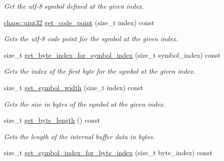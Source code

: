 \begin{DoxyCompactItemize}
\begin{DoxyCompactList}\small\item\em Get the utf-\/8 symbol defined at the given index. \end{DoxyCompactList}\item 
\hyperlink{namespacechaos_a3b3a47ba1e284655bf1a30c441121c60}{chaos\-::uint32} \hyperlink{classchaos_1_1str_1_1_u_t_f8_string_a007889a60f57ec9196dcebb39abeafdf}{get\-\_\-code\-\_\-point} (size\-\_\-t index) const 
\begin{DoxyCompactList}\small\item\em Gets the utf-\/8 code point for the symbol at the given index. \end{DoxyCompactList}\item 
\hypertarget{classchaos_1_1str_1_1_u_t_f8_string_a4dddd9c6133754f5f424033ab28dc0e5}{size\-\_\-t \hyperlink{classchaos_1_1str_1_1_u_t_f8_string_a4dddd9c6133754f5f424033ab28dc0e5}{get\-\_\-byte\-\_\-index\-\_\-for\-\_\-symbol\-\_\-index} (size\-\_\-t symbol\-\_\-index) const }\label{classchaos_1_1str_1_1_u_t_f8_string_a4dddd9c6133754f5f424033ab28dc0e5}

\begin{DoxyCompactList}\small\item\em Gets the index of the first byte for the symbol at the given index. \end{DoxyCompactList}\item 
\hypertarget{classchaos_1_1str_1_1_u_t_f8_string_a0c54a7cfaf4a3c1881b0c933c49a4922}{size\-\_\-t \hyperlink{classchaos_1_1str_1_1_u_t_f8_string_a0c54a7cfaf4a3c1881b0c933c49a4922}{get\-\_\-symbol\-\_\-width} (size\-\_\-t index) const }\label{classchaos_1_1str_1_1_u_t_f8_string_a0c54a7cfaf4a3c1881b0c933c49a4922}

\begin{DoxyCompactList}\small\item\em Gets the size in bytes of the symbol at the given index. \end{DoxyCompactList}\item 
size\-\_\-t \hyperlink{classchaos_1_1str_1_1_u_t_f8_string_a9312a6aac333d68a87066d6f222d119a}{get\-\_\-byte\-\_\-length} () const 
\begin{DoxyCompactList}\small\item\em Gets the length of the internal buffer data in bytes. \end{DoxyCompactList}\item 
\hypertarget{classchaos_1_1str_1_1_u_t_f8_string_aa005c8b0243343ec7308d00fa6e72846}{size\-\_\-t \hyperlink{classchaos_1_1str_1_1_u_t_f8_string_aa005c8b0243343ec7308d00fa6e72846}{get\-\_\-symbol\-\_\-index\-\_\-for\-\_\-byte\-\_\-index} (size\-\_\-t byte\-\_\-index) const }\label{classchaos_1_1str_1_1_u_t_f8_string_aa005c8b0243343ec7308d00fa6e72846}


\end{DoxyCompactItemize}
